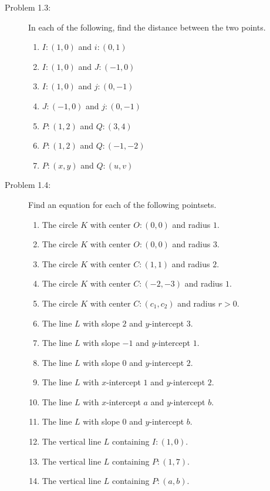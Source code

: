 \documentclass[english]{book}
\begin{document}
\begin{description}

\item[Problem 1.3:] In each of the following, find the distance between the two points.
  \begin{enumerate}[\hspace{1cm}(a)]
    \item $I:(1,0)$ and $i:(0,1)$
    \item $I:(1,0)$ and $J:(-1,0)$
    \item $I:(1,0)$ and $j:(0,-1)$
    \item $J:(-1,0)$ and $j:(0,-1)$
    \item $P:(1,2)$ and $Q:(3,4)$
    \item $P:(1,2)$ and $Q:(-1,-2)$
    \item $P:(x,y)$ and $Q:(u,v)$
  \end{enumerate}

\item[Problem 1.4:] Find an equation for each of the following pointsets.
  \begin{enumerate}[\hspace{1cm}(a)]
    \item The circle $K$ with center $O:(0,0)$ and radius $1$.
    \item The circle $K$ with center $O:(0,0)$ and radius $3$.
    \item The circle $K$ with center $C:(1,1)$ and radius $2$.
    \item The circle $K$ with center $C:(-2,-3)$ and radius $1$.
    \item The circle $K$ with center $C:(c_{1},c_{2})$ and radius $r>0$.
    \item The line $L$ with slope $2$ and $y$-intercept $3$.
    \item The line $L$ with slope $-1$ and $y$-intercept $1$.
    \item The line $L$ with slope $0$ and $y$-intercept $2$.
    \item The line $L$ with $x$-intercept $1$ and $y$-intercept $2$.
    \item The line $L$ with $x$-intercept $a$ and $y$-intercept $b$.
    \item The line $L$ with slope $0$ and $y$-intercept $b$.
    \item The vertical line $L$ containing $I:(1,0)$.
    \item The vertical line $L$ containing $P:(1,7)$.
    \item The vertical line $L$ containing $P:(a,b)$.
  \end{enumerate}


\end{description}
\end{document}
